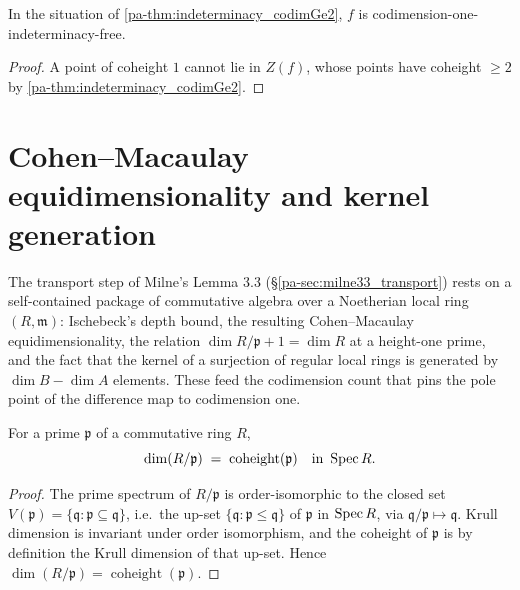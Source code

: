 \begin{corollary}
  \label{pa-cor:codim_one_free_complete}
  \leanok

  In the situation of \ref{pa-thm:indeterminacy_codimGe2}, \(f\) is
  codimension-one-indeterminacy-free.
\end{corollary}
\begin{proof}
  \leanok
  A point of coheight \(1\) cannot lie in \(Z(f)\), whose points have coheight
  \(\geq 2\) by \ref{pa-thm:indeterminacy_codimGe2}.
\end{proof}

\section{Cohen--Macaulay equidimensionality and kernel generation}
\label{pa-sec:cm_equidim}

The transport step of Milne's Lemma 3.3 (\S\ref{pa-sec:milne33_transport}) rests on a
self-contained package of commutative algebra over a Noetherian local ring
\((R, \mathfrak m)\): Ischebeck's depth bound, the resulting Cohen--Macaulay
equidimensionality, the relation \(\dim R/\mathfrak p + 1 = \dim R\) at a
height-one prime, and the fact that the kernel of a surjection of regular local
rings is generated by \(\dim B - \dim A\) elements. These feed the codimension
count that pins the pole point of the difference map to codimension one.

\begin{lemma}
  \label{pa-lem:ringKrullDim_quotient_eq_coheight}
  \leanok

  For a prime \(\mathfrak p\) of a commutative ring \(R\),
  \[
    \dim(R/\mathfrak p) \;=\; \operatorname{coheight}(\mathfrak p)
    \quad\text{in } \operatorname{Spec} R .
  \]
\end{lemma}
\begin{proof}
  \leanok
  The prime spectrum of \(R/\mathfrak p\) is order-isomorphic to the closed set
  \(V(\mathfrak p) = \{\mathfrak q : \mathfrak p \subseteq \mathfrak q\}\), i.e.\
  the up-set \(\{\mathfrak q : \mathfrak p \le \mathfrak q\}\) of \(\mathfrak p\)
  in \(\operatorname{Spec} R\), via \(\mathfrak q/\mathfrak p \mapsto \mathfrak q\). Krull
  dimension is invariant under order isomorphism, and the coheight of
  \(\mathfrak p\) is by definition the Krull dimension of that up-set. Hence
  \(\dim(R/\mathfrak p) = \operatorname{coheight}(\mathfrak p)\).
\end{proof}

